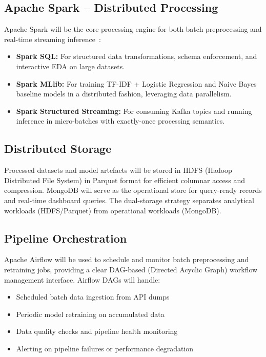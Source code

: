 \documentclass[conference]{IEEEtran}
\begin{document}
\subsection{Apache Spark -- Distributed Processing}
Apache Spark will be the core processing engine for both batch preprocessing and real-time streaming inference~\cite{zaharia2016apache}:
\begin{itemize}[leftmargin=*]
    \item \textbf{Spark SQL:} For structured data transformations, schema enforcement, and interactive EDA on large datasets.
    \item \textbf{Spark MLlib:} For training TF-IDF + Logistic Regression and Naive Bayes baseline models in a distributed fashion, leveraging data parallelism.
    \item \textbf{Spark Structured Streaming:} For consuming Kafka topics and running inference in micro-batches with exactly-once processing semantics.
\end{itemize}

\subsection{Distributed Storage}
Processed datasets and model artefacts will be stored in HDFS (Hadoop Distributed File System) in Parquet format for efficient columnar access and compression. MongoDB will serve as the operational store for query-ready records and real-time dashboard queries. The dual-storage strategy separates analytical workloads (HDFS/Parquet) from operational workloads (MongoDB).

\subsection{Pipeline Orchestration}
Apache Airflow will be used to schedule and monitor batch preprocessing and retraining jobs, providing a clear DAG-based (Directed Acyclic Graph) workflow management interface. Airflow DAGs will handle:
\begin{itemize}[leftmargin=*]
    \item Scheduled batch data ingestion from API dumps
    \item Periodic model retraining on accumulated data
    \item Data quality checks and pipeline health monitoring
    \item Alerting on pipeline failures or performance degradation
\end{itemize}
\end{document}
